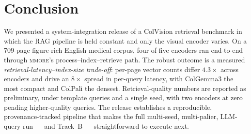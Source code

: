 \documentclass[10pt,a4paper]{article}
\begin{document}
\section{Conclusion}

We presented a system-integration release of a ColVision retrieval benchmark
in which the RAG pipeline is held constant and only the visual encoder
varies. On a 709-page figure-rich English medical corpus, four of five
encoders ran end-to-end through \textsc{mmore}'s process--index--retrieve
path. The robust outcome is a measured \emph{retrieval-latency--index-size
trade-off}: per-page vector counts differ $4.3\times$ across encoders and
drive an $8\times$ spread in per-query latency, with ColGemma3 the most
compact and ColPali the densest. Retrieval-quality numbers are reported as
preliminary, under template queries and a single seed, with two encoders at
zero pending higher-quality queries. The release establishes a reproducible,
provenance-tracked pipeline that makes the full multi-seed, multi-palier,
LLM-query run --- and Track~B --- straightforward to execute next.



\end{document}
